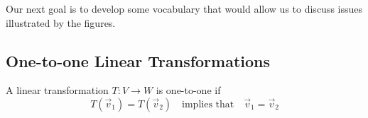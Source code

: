 \documentclass{ximera}
\begin{document}
Our next goal is to develop some vocabulary that would allow us to discuss issues illustrated by the figures.

\begin{center}
\end{center}

\begin{center}
\end{center}


\subsection*{One-to-one Linear Transformations}

\begin{definition}\label{def:onetoone} A linear transformation $T:V\rightarrow W$ is one-to-one if 
$$T(\vec{v}_1)=T(\vec{v}_2)\quad \text{implies that}\quad \vec{v}_1=\vec{v}_2$$
\end{definition}
\end{document}
